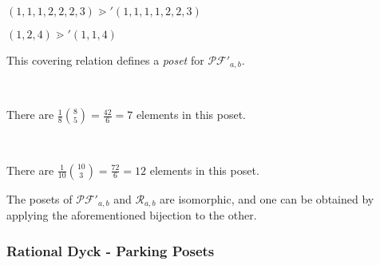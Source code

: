\begin{example}[$a > b : a = 7, b = 3$]
    $(1, 1, 1, 2, 2, 2, 3) \gtrdot' (1, 1, 1, 1, 2, 2, 3)$    
\end{example}

\begin{example}[$a < b : a = 3, b = 5$]
    $(1, 2, 4) \gtrdot' (1, 1, 4)$    
\end{example}

\begin{prop}
    This covering relation defines a \emph{poset}
    for $\mathcal{PF'}_{a,b}$.
\end{prop}

\begin{example}
    ~\\
    \begin{center}
        
        There are $\frac {1}{8} \binom{8}{5} = \frac{42}{6} = 7$
        elements in this poset.
    \end{center}
\end{example}

\begin{example}
    ~\\
    \begin{center}
        
        There are $\frac {1}{10} \binom{10}{3} = \frac{72}{6} = 12$
        elements in this poset.
    \end{center}
\end{example}

\begin{rem}
    The posets of $\mathcal{PF'}_{a,b}$ and $\mathcal{R}_{a,b}$
    are isomorphic, and one can be obtained by
    applying the aforementioned bijection to the other.
\end{rem}

\subsubsection{Rational Dyck - Parking Posets}

